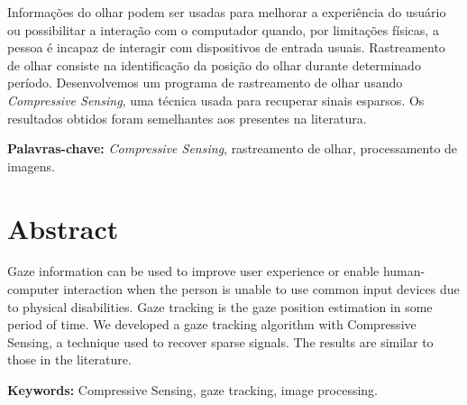 \documentclass[12pt]{report}
\begin{document}
Informações do olhar podem ser usadas para melhorar a experiência do usuário ou possibilitar a interação com o computador quando, por limitações físicas, a pessoa é incapaz de interagir com dispositivos de entrada usuais. Rastreamento de olhar consiste na identificação da posição do olhar durante determinado período. Desenvolvemos um programa de rastreamento de olhar usando \textit{Compressive Sensing}, uma técnica usada para recuperar sinais esparsos. Os resultados obtidos foram semelhantes aos presentes na literatura.

\noindent \textbf{Palavras-chave:} \textit{Compressive Sensing}, rastreamento de olhar, processamento de imagens.



\chapter*{Abstract}

Gaze information can be used to improve user experience or enable human-computer interaction when the person is unable to use common input devices due to physical disabilities. Gaze tracking is the gaze position estimation in some period of time.  We developed a gaze tracking algorithm with Compressive Sensing, a technique used to recover sparse signals. The results are similar to those in the literature.

\noindent \textbf{Keywords:} Compressive Sensing, gaze tracking, image processing.

\tableofcontents    %









%


\end{document}
